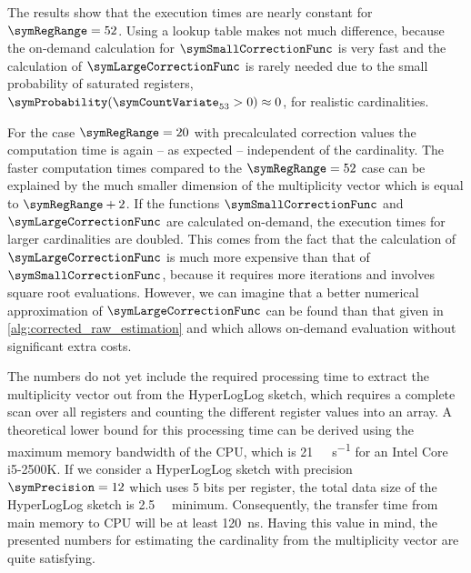 \documentclass[a4paper]{scrartcl}
\begin{document}
The results show that the execution times are nearly constant for $\symRegRange=52$. Using a lookup table makes not much difference, because the on-demand calculation for  $\symSmallCorrectionFunc$ is very fast and the calculation of $\symLargeCorrectionFunc$ is rarely needed due to the small probability of saturated registers, $\symProbability(\symCountVariate_{53}>0)\approx 0$, for realistic cardinalities.

For the case $\symRegRange=20$ with precalculated correction values the computation time is again -- as expected -- independent of the cardinality. The faster computation times compared to the $\symRegRange=52$ case can be explained by the much smaller dimension of the multiplicity vector which is equal to $\symRegRange+2$. If the functions $\symSmallCorrectionFunc$ and $\symLargeCorrectionFunc$ are calculated on-demand, the execution times for larger cardinalities are doubled. This comes from the fact that the calculation of $\symLargeCorrectionFunc$ is much more expensive than that of $\symSmallCorrectionFunc$, because it requires more iterations and involves square root evaluations. However, we can imagine that a better numerical approximation of $\symLargeCorrectionFunc$ can be found than that given in \cref{alg:corrected_raw_estimation} and which allows on-demand evaluation without significant extra costs.

The numbers do not yet include the required processing time to extract the multiplicity vector out from the HyperLogLog sketch, which requires a complete scan over all registers and counting the different register values into an array. A theoretical lower bound for this processing time can be derived using the maximum memory bandwidth of the CPU, which is \SI[per-mode=symbol]{21}{\giga\byte\per\second} for an Intel Core i5-2500K. If we consider a HyperLogLog sketch with precision $\symPrecision=12$ which uses 5 bits per register, the total data size of the HyperLogLog sketch is \SI{2.5}{\kilo\byte} minimum. Consequently, the transfer time from main memory to CPU will be at least \SI{120}{\nano\second}. Having this value in mind, the presented numbers for estimating the cardinality from the multiplicity vector are quite satisfying. 
\end{document}
